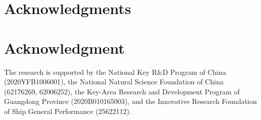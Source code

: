 \documentclass[10pt,journal,compsoc]{IEEEtran}
\begin{document}



\ifCLASSOPTIONcompsoc
  \section*{Acknowledgments}
\else
  \section*{Acknowledgment}
\fi

The research is supported by the National Key R\&D Program of China (2020YFB1006001), the National Natural Science Foundation of China (62176269, 62006252), the Key-Area Research and Development Program of Guangdong Province (2020B010165003), and the Innovative Research Foundation of Ship General Performance (25622112).



\ifCLASSOPTIONcaptionsoff
  \newpage
\fi





%
%
%


\end{document}
